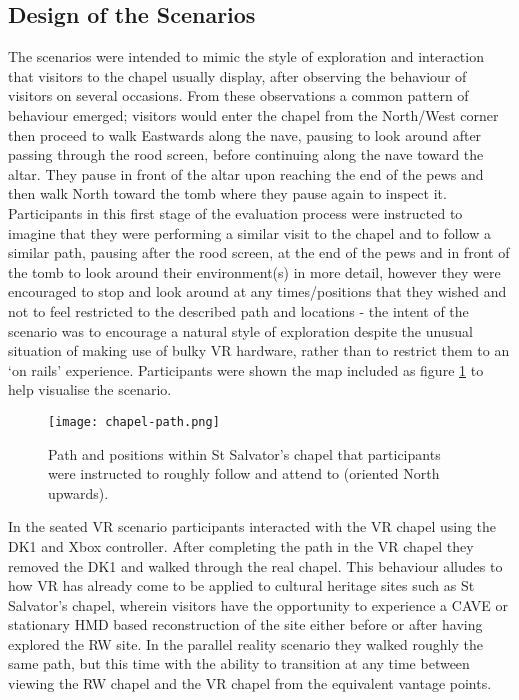 
\subsection{Design of the Scenarios}

The scenarios were intended to mimic the style of exploration and interaction that visitors to the chapel usually display, after observing the behaviour of visitors on several occasions. From these observations a common pattern of behaviour emerged; visitors would enter the chapel from the North/West corner then proceed to walk Eastwards along the nave, pausing to look around after passing through the rood screen, before continuing along the nave toward the altar. They pause in front of the altar upon reaching the end of the pews and then walk North toward the tomb where they pause again to inspect it. Participants in this first stage of the evaluation process were instructed to imagine that they were performing a similar visit to the chapel and to follow a similar path, pausing after the rood screen, at the end of the pews and in front of the tomb to look around their environment(s) in more detail, however they were encouraged to stop and look around at any times/positions that they wished and not to feel restricted to the described path and locations - the intent of the scenario was to encourage a natural style of exploration despite the unusual situation of making use of bulky VR hardware, rather than to restrict them to an `on rails' experience. Participants were shown the map included as figure \ref{chapel-path} to help visualise the scenario.

\begin{figure}
	\begin{center}
		\texttt{[image: chapel-path.png]}
		\caption{Path and positions within St Salvator's chapel that participants were instructed to roughly follow and attend to (oriented North upwards).}
		\label{chapel-path}
	\end{center}
\end{figure}

In the seated VR scenario participants interacted with the VR chapel using the DK1 and Xbox controller. After completing the path in the VR chapel they removed the DK1 and walked through the real chapel. This behaviour alludes to how VR has already come to be applied to cultural heritage sites such as St Salvator's chapel, wherein visitors have the opportunity to experience a CAVE or stationary HMD based reconstruction of the site either before or after having explored the RW site. In the parallel reality scenario they walked roughly the same path, but this time with the ability to transition at any time between viewing the RW chapel and the VR chapel from the equivalent vantage points.

